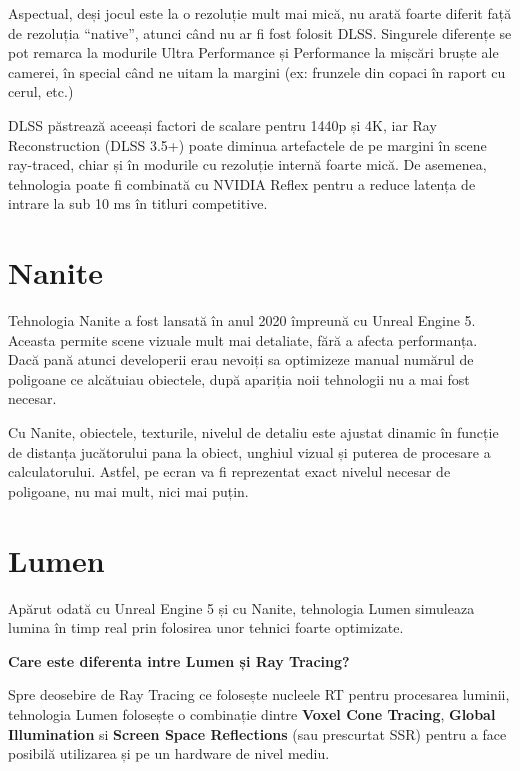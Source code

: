 \noindent Aspectual, deși jocul este la o rezoluție mult mai mică, nu arată foarte diferit față de rezoluția “native”, atunci când nu ar fi fost folosit DLSS. Singurele diferențe se pot remarca la modurile Ultra Performance și Performance la mișcări bruște ale camerei, în special când ne uitam la margini (ex: frunzele din copaci în raport cu cerul, etc.)

DLSS păstrează aceeași factori de scalare pentru 1440p și 4K, iar Ray Reconstruction (DLSS 3.5+) poate diminua artefactele de pe margini în scene ray-traced, chiar și în modurile cu rezoluție internă foarte mică. De asemenea, tehnologia poate fi combinată cu NVIDIA Reflex pentru a reduce latența de intrare la sub 10 ms în titluri competitive.

\section{Nanite}

Tehnologia Nanite a fost lansată în anul 2020 împreună cu Unreal Engine 5. Aceasta permite scene vizuale mult mai detaliate, fără a afecta performanța. Dacă pană atunci developerii erau nevoiți sa optimizeze manual numărul de poligoane ce alcătuiau obiectele, după apariția noii tehnologii nu a mai fost necesar. 

Cu Nanite, obiectele, texturile, nivelul de detaliu este ajustat dinamic în funcție de distanța jucătorului pana la obiect, unghiul vizual și puterea de procesare a calculatorului. Astfel, pe ecran va fi reprezentat exact nivelul necesar de poligoane, nu mai mult, nici mai puțin.

\section{Lumen}

Apărut odată cu Unreal Engine 5 și cu Nanite, tehnologia Lumen simuleaza lumina în timp real prin folosirea unor tehnici foarte optimizate.

\textbf{Care este diferenta intre Lumen și Ray Tracing?}

Spre deosebire de Ray Tracing ce folosește nucleele RT pentru procesarea luminii, tehnologia Lumen folosește o combinație dintre \textbf{Voxel Cone Tracing}, \textbf{Global Illumination} si \textbf{Screen Space Reflections} (sau prescurtat SSR) pentru a face posibilă utilizarea și pe un hardware de nivel mediu. 

